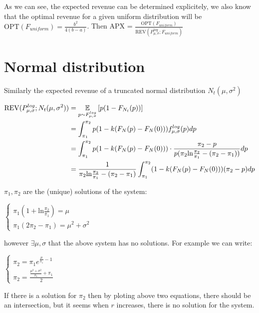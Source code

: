 As we can see, the expected revenue can be determined explicitely, we also know that the optimal revenue for a given uniform distribution will be $\text{OPT}(F_{uniform}) = \frac{b^{2}}{4(b-a)}$. Then APX = $\frac{\text{OPT}(F_{uniform})}{\text{REV}(P^{log}_{\mu,\sigma} ;F_{uniform}) }$ 

\section{Normal distribution}
Similarly the expected revenue of a truncated normal distribution $N_t(\mu, \sigma^2)$

\begin{equation}\notag
\begin{split}	
	\text{REV}(P^{log}_{\mu,\sigma} ;N_t(\mu, \sigma^2)) &=\underset{p \sim F^{log}_{\mu,\sigma} }{\mathbb{E}}\left[ p(1-F_{N_t}(p))\right] \\ &= \int_{\pi_1}^{\pi_2} p(1 -  k(F_{N}(p)-F_{N}(0)))f^{log}_{\mu,\sigma}(p)dp \\&=\int_{\pi_1}^{\pi_2} p(1 -  k(F_{N}(p)-F_{N}(0)))\cdot \frac{\pi_2 -p}{p(\pi_2 \text{ln}\frac{\pi_2}{\pi_1} - (\pi_2-\pi_1))} dp \\&=  \frac{1}{\pi_2 \text{ln}\frac{\pi_2}{\pi_1} - (\pi_2-\pi_1)}\int_{\pi_1}^{\pi_2} (1 -  k(F_{N}(p)-F_{N}(0)))(\pi_2-p)dp 
\end{split}
\end{equation} 


$\pi_1, \pi_2$ are the (unique) solutions of the system: 
\begin{center}
	$\begin{cases} \pi_1 (1 + \text{ln}\frac{\pi_2}{\pi_1}) = \mu   \\    \pi_1(2\pi_2 - \pi_1) = \mu^2 + \sigma^2  \end{cases}$
\end{center}

however $\exists \mu, \sigma$ that the above system has no solutions. For example we can write:

\begin{center}
	$\begin{cases} \pi_2 = \pi_1 e^{\frac{\mu}{\pi_1}-1}   \\  \pi_2= \frac{\frac{\mu^2 + \sigma^2 }{\pi_1} +\pi_1}{2}  \end{cases}$
\end{center}

If there is a solution for $\pi_2$ then by ploting above two equations, there should be an intersection, but it seems when $r$ increases, there is no solution for the system. \\




